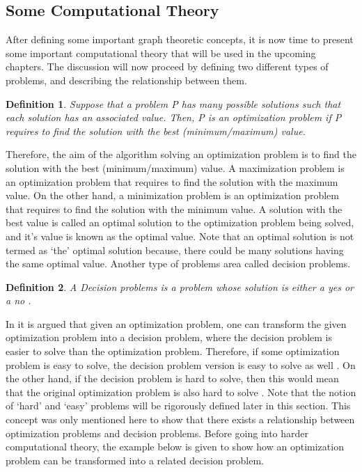 \documentclass[12pt]{article}
\newtheorem{definition}{Definition}[subsection]
\numberwithin{equation}{subsection}
\numberwithin{table}{subsection}
\numberwithin{algorithm}{subsection}
\begin{document}
\subsection{Some Computational Theory}
\label{computational_theory}
After defining some important graph theoretic concepts, it is now time to present some important computational theory that will be used in the upcoming chapters. The discussion will now proceed by defining two different types of problems, and describing the relationship between them.
\begin{definition}
\label{optimization problems}
Suppose that a problem P has many possible solutions such that each solution has an associated value. Then, P is an optimization problem if P requires to find the solution with the best (minimum/maximum) value.  
\end{definition}
Therefore, the aim of the algorithm solving an optimization problem is to find the solution with the best (minimum/maximum) value. A maximization problem is an optimization problem that requires to find the solution with the maximum value. On the other hand, a minimization problem is an optimization problem that requires to find the solution with the minimum value. A solution with the best value is called an optimal solution to the optimization problem being solved, and it's value is known as the optimal value. Note that an optimal solution is not termed as `the' optimal solution because, there could be many solutions having the same optimal value. Another type of problems area called decision problems. \cite{cormen_leiserson_rivest_stein}
\begin{definition}
\label{decision problems}
A Decision problems is a problem whose solution is either a yes or a no .
\end{definition}
In \cite{cormen_leiserson_rivest_stein} it is argued that given an optimization problem, one can transform the given optimization problem into a decision problem, where the decision problem is easier to solve than the optimization problem. Therefore, if some optimization problem is easy to solve, the decision problem version is easy to solve as well \cite{cormen_leiserson_rivest_stein}. On the other hand, if the decision problem is hard to solve, then this would mean that the original optimization problem is also hard to solve \cite{cormen_leiserson_rivest_stein}. Note that the notion of `hard' and `easy' problems will be rigorously defined later in this section. This concept was only mentioned here to show that there exists a relationship between optimization problems and decision problems. Before going into harder computational theory, the example below is given to show how an optimization problem can be transformed into a related decision problem.
\end{document}
